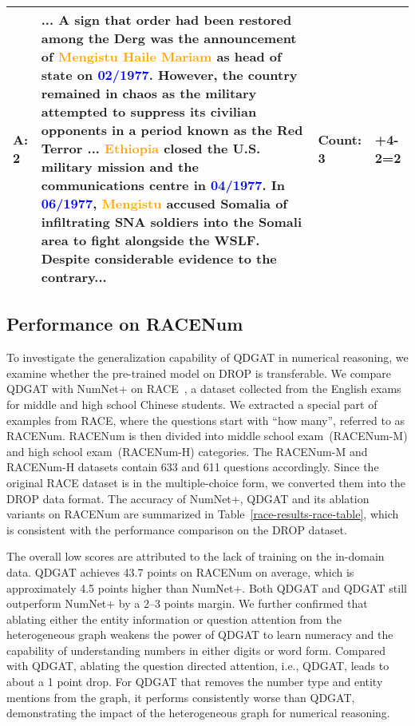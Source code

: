 \documentclass{article}
\begin{document}
\begin{table*}[!h]
\begin{center}
\begin{tabularx}{\linewidth}{JiKK}
\textbf{A:} 2 & ... A sign that order had been restored among the Derg was the announcement of \textcolor{orange}{Mengistu Haile Mariam} as head of state on \textcolor{blue}{02/1977}. However, the country remained in chaos as the military attempted to suppress its civilian opponents in a period known as the Red Terror ... \textcolor{orange}{Ethiopia} closed the U.S. military mission and the communications centre in \textcolor{blue}{04/1977}. In \textcolor{blue}{06/1977}, \textcolor{orange}{Mengistu} accused Somalia of infiltrating SNA soldiers into the Somali area to fight alongside the WSLF. Despite considerable evidence to the contrary... & Count: 3 &+4-2=2 \\
\bottomrule
\end{tabularx}
\end{center}
\label{tab:cases}
\end{table*}



\subsection{Performance on RACENum}
To investigate the generalization capability of QDGAT in numerical reasoning, we examine whether the pre-trained model on DROP is transferable.
We compare QDGAT with NumNet+ on RACE~\cite{lai-etal-2017-race}, a dataset collected from the English exams for middle and high school Chinese students.  
We extracted a special part of examples from RACE, where the questions start with ``how many'', referred to as RACENum.
RACENum is then divided into middle school exam~(RACENum-M) and high school exam~(RACENum-H) categories.
The RACENum-M and RACENum-H datasets contain 633 and 611 questions accordingly.
Since the original RACE dataset is in the multiple-choice form, we converted them into the DROP data format.
The accuracy of NumNet+, QDGAT and its ablation variants on RACENum are summarized in Table~\ref{race-results-race-table}, which is consistent with the performance comparison on the DROP dataset.


The overall low scores are attributed to the lack of training on the in-domain data.
QDGAT achieves 43.7 points on RACENum on average, which is approximately 4.5 points higher than NumNet+.
Both QDGAT and QDGAT still outperform NumNet+ by a 2--3 points margin.
We further confirmed that ablating either the entity information or question attention from the heterogeneous graph weakens the power of QDGAT to learn numeracy and the capability of understanding numbers in either digits or word form. 
Compared with QDGAT, ablating the question directed attention, i.e., QDGAT, leads to about a 1 point drop. For QDGAT that removes the number type and entity mentions from the graph, it performs consistently worse than QDGAT, demonstrating the impact of the heterogeneous graph for numerical reasoning. 
\end{document}

